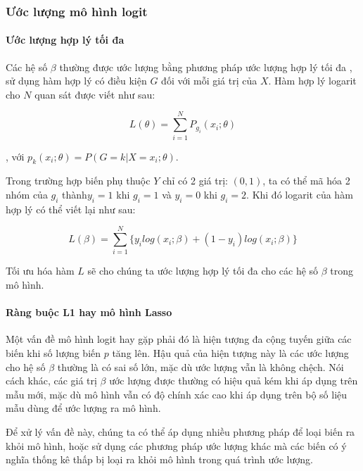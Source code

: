 \documentclass[a4paper]{report}\usepackage[]{graphicx}\usepackage[]{color}
\begin{document}
\subsubsection{Ước lượng mô hình logit}
\paragraph{Ước lượng hợp lý tối đa}


Các hệ số $\beta$ thường được ước lượng bằng phương pháp ước lượng hợp lý tối đa \parencite{hosmer2013applied}, sử dụng hàm hợp lý có điều kiện $G$ đối với mỗi giá trị của $X$. Hàm hợp lý logarit cho $N$ quan sát được viết như sau:

{\large

$$
L(\theta) = \sum_{i = 1}^N P_{g_i} (x_i; \theta)
$$
}
, với $p_k(x_i;\theta) = P(G = k|X = x_i; \theta)$.

Trong trường hợp biến phụ thuộc $Y$ chỉ có 2 giá trị: $(0, 1)$, ta có thể mã hóa 2 nhóm của $g_i$ thành$y_i = 1$ khi $g_i = 1$ và $y_i = 0$ khi $g_i = 2$. Khi đó logarit của hàm hợp lý có thể viết lại như  sau: 

{\large
$$
L(\beta) = \sum_{i = 1}^N \{  y_i log (x_i ; \beta) + (1- y_i)log (x_i; \beta) \}
$$
}

Tối ưu hóa hàm $L$ sẽ cho chúng ta ước lượng hợp lý tối đa cho các hệ số $\beta$ trong mô hình.

\paragraph{Ràng buộc L1 hay mô hình Lasso}

Một vấn đề mô hình logit hay gặp phải đó là hiện tượng đa cộng tuyến giữa các biến khi số lượng biến $p$ tăng lên. Hậu quả của hiện tượng này là các ước lượng cho hệ số $\beta$ thường là có sai số lớn, mặc dù ước lượng vẫn là không chệch. Nói cách khác, các giá trị $\beta$ ước lượng được thường có hiệu quả kém khi áp dụng trên mẫu mới, mặc dù mô hình vẫn có độ chính xác cao khi áp dụng trên bộ số liệu mẫu dùng để ước lượng ra mô hình. 

Để xử lý vấn đề này, chúng ta có thể áp dụng nhiều phương pháp để loại biến ra khỏi mô hình, hoặc sử dụng các phương pháp ước lượng khác mà các biến có ý nghĩa thống kê thấp bị loại ra khỏi mô hình trong quá trình ước lượng.
\end{document}
